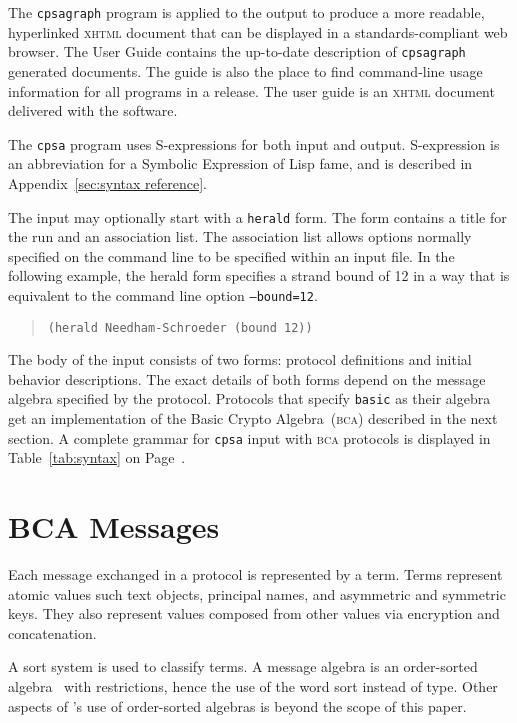 \documentclass[12pt]{article}
\begin{document}
The \texttt{cpsagraph} program is applied to the output to produce a
more readable, hyperlinked \textsc{xhtml} document that can be displayed
in a standards-compliant web browser.  The {\cpsa} User Guide contains
the up-to-date description of \texttt{cpsagraph} generated documents.
The guide is also the place to find command-line usage information for
all programs in a release.  The user guide is an \textsc{xhtml}
document delivered with the software.

The \texttt{cpsa} program uses S-expressions for both input and
output.  S-expression is an abbreviation for a Symbolic Expression of
Lisp fame, and is described in Appendix~\ref{sec:syntax reference}.

The input may optionally start with a \texttt{herald} form.  The form
contains a title for the run and an association list.  The association
list allows options normally specified on the command line to be
specified within an input file.  In the following example, the herald
form specifies a strand bound of 12 in a way that is equivalent to the
command line option \texttt{--bound=12}.

\begin{quote}
\begin{verbatim}
(herald Needham-Schroeder (bound 12))
\end{verbatim}
\end{quote}

The body of the input consists of two forms: protocol definitions and
initial behavior descriptions.  The exact details of both forms depend
on the message algebra specified by the protocol.  Protocols that
specify \texttt{basic} as their algebra get an implementation of the
Basic Crypto Algebra~(\textsc{bca}) described in the next section.  A
complete grammar for \texttt{cpsa} input with \textsc{bca} protocols
is displayed in Table~\ref{tab:syntax} on Page~\pageref{tab:syntax}.

\section{BCA Messages}

Each message exchanged in a protocol is represented by a term.  Terms
represent atomic values such text objects, principal names, and
asymmetric and symmetric keys.  They also represent values composed
from other values via encryption and concatenation.

A sort system is used to classify terms. A {\cpsa} message algebra is
an order-sorted algebra~\cite{GoguenMeseguer92} with restrictions,
hence the use of the word sort instead of type.  Other aspects of
{\cpsa}'s use of order-sorted algebras is beyond the scope of this
paper.
\end{document}
